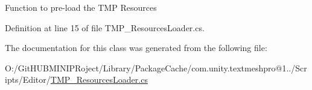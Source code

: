 Function to pre-\/load the T\+MP Resources 



Definition at line 15 of file T\+M\+P\+\_\+\+Resources\+Loader.\+cs.



The documentation for this class was generated from the following file\+:\begin{DoxyCompactItemize}
\item 
O\+:/\+Git\+H\+U\+B\+M\+I\+N\+I\+P\+Roject/\+Library/\+Package\+Cache/com.\+unity.\+textmeshpro@1../\+Scripts/\+Editor/\mbox{\hyperlink{_t_m_p___resources_loader_8cs}{T\+M\+P\+\_\+\+Resources\+Loader.\+cs}}\end{DoxyCompactItemize}
